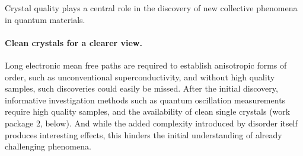 Crystal quality plays a central role in the discovery of new collective phenomena in quantum materials. %


\paragraph{Clean crystals for a clearer view.} Long electronic mean free paths are required to establish anisotropic forms of order, such as unconventional superconductivity, and without high quality samples, such discoveries could easily be missed. After the initial discovery, informative investigation methods such as quantum oscillation measurements require high quality samples, and the availability of clean single crystals  (work package 2, below). And while the added complexity introduced by disorder itself produces interesting effects, this hinders the initial understanding of already challenging phenomena. %


